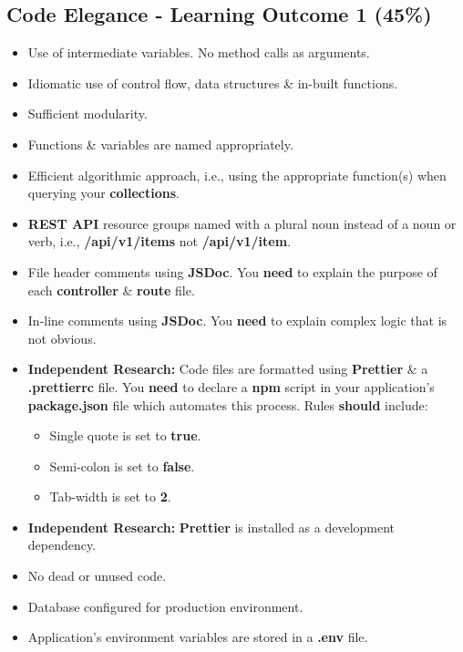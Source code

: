 \documentclass{article}
\begin{document}
\subsection*{Code Elegance - Learning Outcome 1 (45\%)}
\begin{itemize}
	\item Use of intermediate variables. No method calls as arguments.
	\item Idiomatic use of control flow, data structures \& in-built functions.
	\item Sufficient modularity.
	\item Functions \& variables are named appropriately.
	\item Efficient algorithmic approach, i.e., using the appropriate function(s) when querying your \textbf{collections}.
	\item \textbf{REST API} resource groups named with a plural noun instead of a noun or verb, i.e., \textbf{/api/v1/items} not \textbf{/api/v1/item}.
	\item File header comments using \textbf{JSDoc}. You \textbf{need} to explain the purpose of each \textbf{controller} \& \textbf{route} file.
	\item In-line comments using \textbf{JSDoc}. You \textbf{need} to explain complex logic that is not obvious.
	\item \textbf{Independent Research:} Code files are formatted using \textbf{Prettier} \& a \textbf{.prettierrc} file. You \textbf{need} to declare a \textbf{npm} script in your application's \textbf{package.json} file which automates this process. Rules \textbf{should} include:
	      \begin{itemize}
		      \item Single quote is set to \textbf{true}.
		      \item Semi-colon is set to \textbf{false}.
		      \item Tab-width is set to \textbf{2}.
	      \end{itemize}
	\item \textbf{Independent Research:} \textbf{Prettier} is installed as a development dependency.
	\item No dead or unused code.
	\item Database configured for production environment.
	\item Application's environment variables are stored in a \textbf{.env} file.
\end{itemize}
\end{document}
